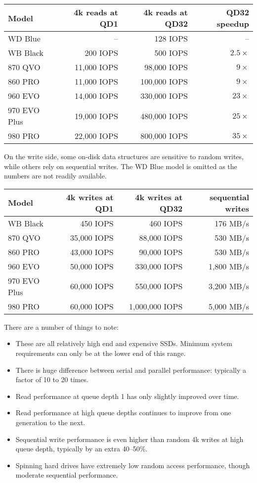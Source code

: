 \documentclass[11pt,a4paper]{article}
\begin{document}
\begin{center}
\begin{tabular}[]{lrrr}
  Model & 4k reads at QD1 & 4k reads at QD32 & QD32 speedup \\
  \toprule
  WD Blue      &    --       &     128 IOPS & -- \\
  WB Black     &    200 IOPS &     500 IOPS & $2.5\times$ \\
  870 QVO      & 11,000 IOPS &  98,000 IOPS & $9\times$ \\
  860 PRO      & 11,000 IOPS & 100,000 IOPS & $9\times$ \\
  960 EVO      & 14,000 IOPS & 330,000 IOPS & $23\times$ \\
  970 EVO Plus & 19,000 IOPS & 480,000 IOPS & $25\times$ \\
  980 PRO      & 22,000 IOPS & 800,000 IOPS & $35\times$
\end{tabular}
\end{center}
On the write side, some on-disk data structures are sensitive to random writes,
while others rely on sequential writes. The WD Blue model is omitted as the
numbers are not readily available.
\begin{center}
\begin{tabular}[]{lrrr}
  Model & 4k writes at QD1 & 4k writes at QD32 & sequential writes \\
  \toprule
  WB Black     &    450 IOPS &       460 IOPS &   176 MB/s \\
  870 QVO      & 35,000 IOPS &    88,000 IOPS &   530 MB/s \\
  860 PRO      & 43,000 IOPS &    90,000 IOPS &   530 MB/s \\
  960 EVO      & 50,000 IOPS &   330,000 IOPS & 1,800 MB/s \\
  970 EVO Plus & 60,000 IOPS &   550,000 IOPS & 3,200 MB/s \\
  980 PRO      & 60,000 IOPS & 1,000,000 IOPS & 5,000 MB/s
\end{tabular}
\end{center}
There are a number of things to note:
\begin{itemize}
\item These are all relatively high end and expensive SSDs. Minimum system
      requirements can only be at the lower end of this range.
\item There is huge difference between serial and parallel performance:
      typically a factor of 10 to 20 times.
\item Read performance at queue depth 1 has only slightly improved over time.
\item Read performance at high queue depths continues to improve from one
      generation to the next.
\item Sequential write performance is even higher than random 4k writes at
      high queue depth, typically by an extra 40--50\%.
\item Spinning hard drives have extremely low random access performance, though
      moderate sequential performance.
\end{itemize}
\end{document}
